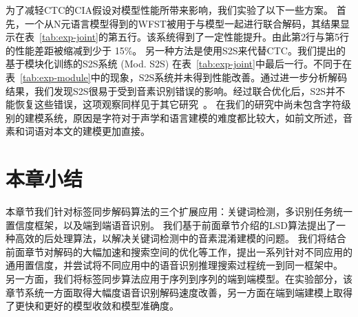 为了减轻CTC的CIA假设对模型性能所带来影响，我们实验了以下一些方案。
首先，一个从N元语言模型得到的WFST被用于与模型一起进行联合解码，其结果显示在表~\ref{tab:exp-joint}的第五行。该系统得到了一定性能提升。由此第2行与第5行的性能差距被缩减到少于 15\%。
%
另一种方法是使用S2S来代替CTC。我们提出的基于模块化训练的S2S系统 (Mod. S2S) 在表~\ref{tab:exp-joint}中最后一行。不同于在表~\ref{tab:exp-module}中的现象，S2S系统并未得到性能改善。通过进一步分析解码结果，我们发现S2S很易于受到音素识别错误的影响。经过联合优化后，S2S并不能恢复这些错误，这项观察同样见于其它研究~\cite{prabhavalkar2017comparison}。
在我们的研究中尚未包含字符级别的建模系统，原因是字符对于声学和语言建模的难度都比较大，如前文所述，音素和词语对本文的建模更加直接。


    
\section{本章小结}
\label{chap:unify-sum}



本章节我们针对标签同步解码算法的三个扩展应用：关键词检测，多识别任务统一置信度框架，以及端到端语音识别。
%
我们基于前面章节介绍的LSD算法提出了一种高效的后处理算法，以解决关键词检测中的音素混淆建模的问题。
%
我们将结合前面章节对解码的大幅加速和搜索空间的优化等工作，提出一系列针对不同应用的通用置信度，并尝试将不同应用中的语音识别推理搜索过程统一到同一框架中。
%
另一方面，我们将标签同步算法应用于序列到序列的端到端模型。在实验部分，该章节系统一方面取得大幅度语音识别解码速度改善，另一方面在端到端建模上取得了更快和更好的模型收敛和模型准确度。
